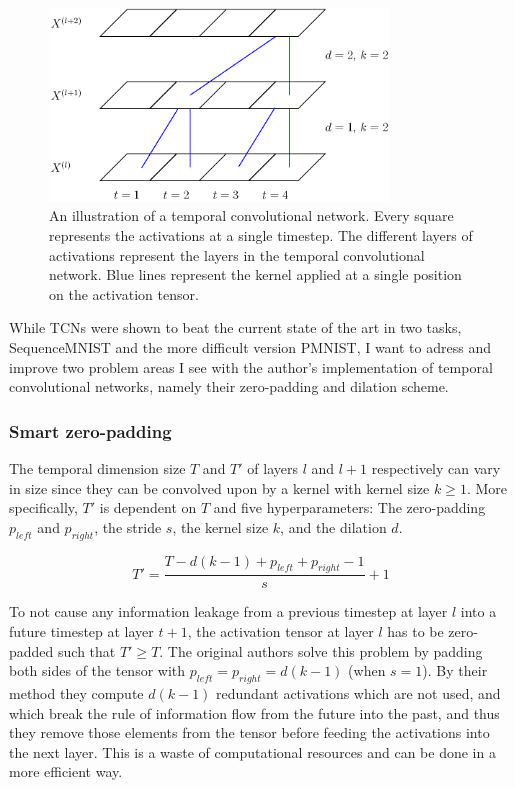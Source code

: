 \documentclass[a4paper, twoside]{article}
\begin{document}
\begin{figure}[h]
\begin{center}
    \includegraphics[width=9cm]{figTCNdil.eps}\caption{An illustration of a temporal convolutional network. Every square represents the activations at a single timestep. The different layers of activations represent the layers in the temporal convolutional network. Blue lines represent the kernel applied at a single position on the activation tensor.} 
    
    \label{figTCNdil}
\end{center}
\end{figure}

While TCNs \cite{tcn} were shown to beat the current state of the art in two tasks, SequenceMNIST and the more difficult version PMNIST, I want to adress and improve two problem areas I see with the author's implementation of temporal convolutional networks, namely their zero-padding and dilation scheme.

\subsubsection{Smart zero-padding}
The temporal dimension size $T$ and $T'$ of layers $l$ and $l+1$ respectively can vary in size since they can be convolved upon by a kernel with kernel size $k \geq 1$. More specifically, $T'$ is dependent on $T$ and five hyperparameters: The zero-padding $p_{left}$ and $p_{right}$, the stride $s$, the kernel size $k$, and the dilation $d$.

\begin{equation}
T' = \frac{T-d(k-1)+p_{left}+p_{right}-1}{s}+1
\end{equation}

To not cause any information leakage from a previous timestep at layer $l$ into a future timestep at layer $t+1$, the activation tensor at layer $l$ has to be zero-padded such that $T' \geq T$. The original authors \cite{tcn} solve this problem by padding both sides of the tensor with $p_{left} = p_{right} = d(k-1)$ (when $s=1$). By their method they compute $d(k-1)$ redundant activations which are not used, and which break the rule of information flow from the future into the past, and thus they remove those elements from the tensor before feeding the activations into the next layer. This is a waste of computational resources and can be done in a more efficient way.
\end{document}
